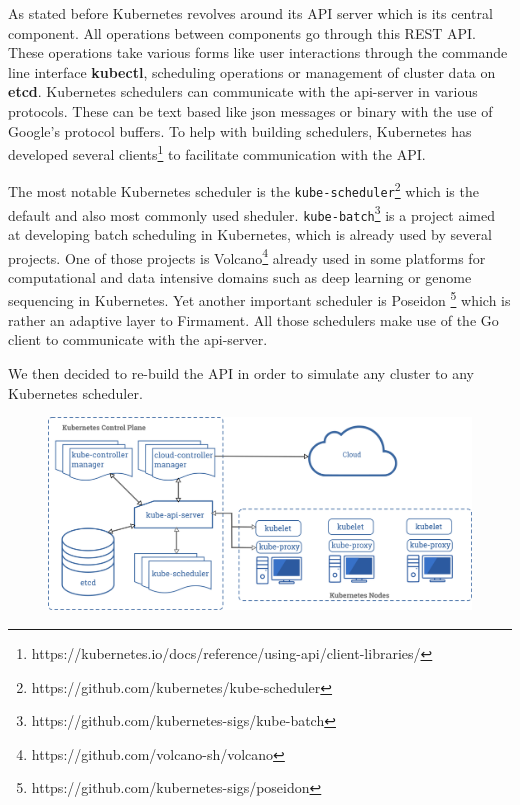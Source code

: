 As stated before Kubernetes revolves around its API server which is its central
component. All operations between components go through this REST API. These
operations take various forms like user interactions through the commande line
interface \textbf{kubectl}, scheduling operations or management of cluster data
on \textbf{etcd}. Kubernetes schedulers can communicate with the api-server in
various protocols. These can be text based like json messages or binary with
the use of Google's protocol buffers. To help with building schedulers,
Kubernetes has developed several
clients\footnote{https://kubernetes.io/docs/reference/using-api/client-libraries/}
to facilitate communication with the API. 

The most notable Kubernetes scheduler is the
\texttt{kube-scheduler}\footnote{https://github.com/kubernetes/kube-scheduler}
which is the default and also most commonly used sheduler.
\texttt{kube-batch}\footnote{https://github.com/kubernetes-sigs/kube-batch} is
a project aimed at developing batch scheduling in Kubernetes, which is already
used by several projects. One of those projects is
Volcano\footnote{https://github.com/volcano-sh/volcano} already used in some
platforms for computational and data intensive domains such as deep learning or
genome sequencing in Kubernetes. Yet another important scheduler is Poseidon
\footnote{https://github.com/kubernetes-sigs/poseidon} which is rather an
adaptive layer to Firmament. All those schedulers make use of the Go client to
communicate with the api-server.

We then decided to re-build the API in order to simulate any
cluster to any Kubernetes scheduler.

\begin{figure}[h]
	\centering
	\includegraphics[width=\textwidth]{./imgs/components-of-kubernetes.png}
	\label{fig:kube-components}
\end{figure}

